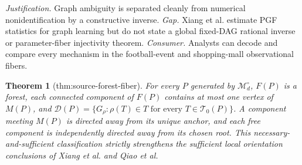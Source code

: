 \documentclass{article}
\newtheorem{theorem}{Theorem}
\begin{document}
\par\smallskip\noindent \textit{Justification.} Graph ambiguity is separated cleanly from numerical nonidentification by a constructive inverse. \textit{Gap.} Xiang et al. estimate PGF statistics for graph learning but do not state a global fixed-DAG rational inverse or parameter-fiber injectivity theorem. \textit{Consumer.} Analysts can decode and compare every mechanism in the football-event and shopping-mall observational fibers.

\begin{theorem}[thm:source-forest-fiber]\label{thm:source-forest-fiber}
For every \(P\) generated by \(\mathcal M_d^\circ\), \(F(P)\) is a forest, each connected component of \(F(P)\) contains at most one vertex of \(M(P)\), and \(\mathcal D(P)=\{G_\rho:\rho(T)\in T\text{ for every }T\in\mathcal T_0(P)\}\). A component meeting \(M(P)\) is directed away from its unique anchor, and each free component is independently directed away from its chosen root. This necessary-and-sufficient classification strictly strengthens the sufficient local orientation conclusions of Xiang et al. and Qiao et al.
\end{theorem}
\end{document}
